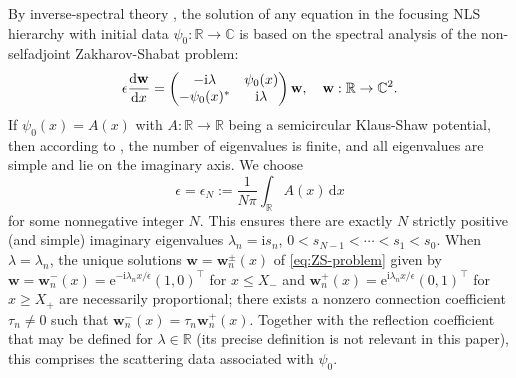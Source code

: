 \documentclass[12pt]{amsart}
\numberwithin{equation}{section}
\newcommand{\dd}{\mathrm{d}}
\newcommand{\ee}{\mathrm{e}}
\newcommand{\ii}{\mathrm{i}}
\newcommand{\SP}{\lambda}
\def\eq{\begin{equation}}
\def\endeq{\end{equation}}
\begin{document}
By inverse-spectral theory \cite{ZakharovS72}, the solution of any equation in the focusing NLS hierarchy with initial data $\psi_0:\mathbb{R}\to\mathbb{C}$ is based on the spectral analysis of the non-selfadjoint Zakharov-Shabat problem:
\eq
\epsilon \frac{\dd{\bf w}}{\dd x} = \begin{pmatrix} -\ii\SP & \psi_0(x) \\ -\psi_0(x)^* & \ii\SP \end{pmatrix}{\bf w}, \quad {\bf w}:\mathbb{R}\to\mathbb{C}^2.
\label{eq:ZS-problem}
\endeq
If $\psi_0(x)=A(x)$ with $A:\mathbb{R}\to\mathbb{R}$ being a semicircular Klaus-Shaw potential, then according to \cite{KlausS02}, the number of eigenvalues is 
finite, and all eigenvalues are simple and lie on the imaginary axis.  We 
choose
\eq
\label{eq:ZS-epsilon-assumption}
\epsilon = \epsilon_N:=\frac{1}{N\pi}\int_\mathbb{R}A(x)\,\dd x
\endeq
for some nonnegative integer $N$.  This ensures there are exactly 
$N$ strictly positive (and simple) imaginary eigenvalues $\SP_n=\ii s_n$, 
$0<s_{N-1}<\cdots<s_1<s_0$.  When $\SP=\SP_n$, the unique solutions $\mathbf{w}=\mathbf{w}_n^\pm(x)$ of \eqref{eq:ZS-problem} given by $\mathbf{w}=\mathbf{w}^-_n(x)=\ee^{-\ii\SP_n x/\epsilon}(1,0)^\top$ for $x\le X_-$ and $\mathbf{w}^+_n(x)=\ee^{\ii\SP_n x/\epsilon}(0,1)^\top$ for $x\ge X_+$ are necessarily proportional; there exists a nonzero connection coefficient $\tau_n\neq 0$ such that $\mathbf{w}_n^-(x)=\tau_n\mathbf{w}_n^+(x)$. Together with the reflection coefficient that may be defined for $\SP\in\mathbb{R}$ (its precise definition is not relevant in this paper), this comprises the scattering data associated with $\psi_0$.
\end{document}
